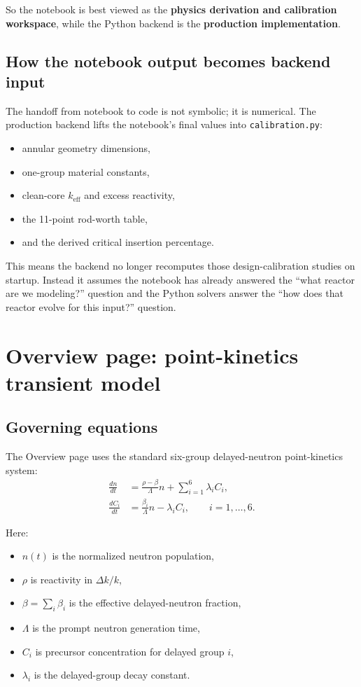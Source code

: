 \documentclass[11pt]{article}
\begin{document}
So the notebook is best viewed as the \textbf{physics derivation and calibration
workspace}, while the Python backend is the \textbf{production implementation}.

\subsection{How the notebook output becomes backend input}

The handoff from notebook to code is not symbolic; it is numerical.  The
production backend lifts the notebook's final values into
\texttt{calibration.py}:
\begin{itemize}
  \item annular geometry dimensions,
  \item one-group material constants,
  \item clean-core $k_{\mathrm{eff}}$ and excess reactivity,
  \item the 11-point rod-worth table,
  \item and the derived critical insertion percentage.
\end{itemize}

This means the backend no longer recomputes those design-calibration studies on
startup.  Instead it assumes the notebook has already answered the
``what reactor are we modeling?'' question and the Python solvers answer the
``how does that reactor evolve for this input?'' question.

\section{Overview page: point-kinetics transient model}

\subsection{Governing equations}

The Overview page uses the standard six-group delayed-neutron point-kinetics
system:
\begin{align}
\frac{dn}{dt} &= \frac{\rho - \beta}{\Lambda} n + \sum_{i=1}^{6}\lambda_i C_i,
\\
\frac{dC_i}{dt} &= \frac{\beta_i}{\Lambda} n - \lambda_i C_i,
\qquad i=1,\dots,6.
\end{align}

Here:
\begin{itemize}
  \item $n(t)$ is the normalized neutron population,
  \item $\rho$ is reactivity in $\Delta k/k$,
  \item $\beta = \sum_i \beta_i$ is the effective delayed-neutron fraction,
  \item $\Lambda$ is the prompt neutron generation time,
  \item $C_i$ is precursor concentration for delayed group $i$,
  \item $\lambda_i$ is the delayed-group decay constant.
\end{itemize}
\end{document}
